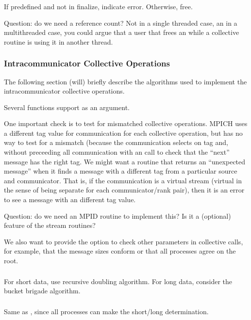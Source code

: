 \documentclass{article}
\begin{document}
\subsubsection{}
If predefined and not in finalize, indicate error.
Otherwise, free.  

Question: do we need a reference count?  Not in a single threaded
case, an in a multithreaded case, you could argue that a user that
frees an  while a collective routine is using it in
another thread.

\subsubsection{Intracommunicator Collective Operations}
The following section (will) briefly describe the algorithms used to implement
the intracommunicator collective operations.

Several functions support  as an argument.

One important check is to test for mismatched collective operations.
MPICH uses a different tag value for communication for each collective
operation, but has no way to test for a mismatch (because the
communication selects on tag and, without preceeding all communication
with an  call to check that the ``next'' message
has the right tag.  We might want a routine that returns an
``unexpected message'' when it finds a message with a different tag
from a particular source and communicator.
That is, if the communication is a virtual stream (virtual in the
sense of being separate for each communicator/rank pair), then it is
an error to see a message with an different tag value.  

Question: do we need an MPID routine to implement this? Is it a
(optional) feature of the stream routines?

We also want to provide the option to check other parameters in
collective calls, for example, that the message sizes conform or that
all processes agree on the root.

\subsubsection{}
For short data, use recursive doubling algorithm.  For long data, consider the
bucket brigade algorithm.

\subsubsection{}
Same as , since all processes can make the
short/long determination.
\end{document}
